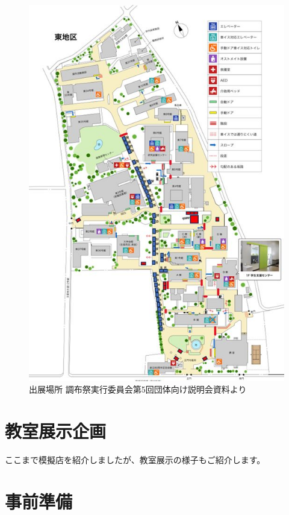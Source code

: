 \documentclass[../super_nova_20yy]{subfiles}
\begin{document}
\begin{figure}[H]
  \centering
  \includegraphics[width=.9\columnwidth]{画像5.jpg}
  \caption{出展場所 調布祭実行委員会第5回団体向け説明会資料より}
  \label{fig:5}
\end{figure}

\section{教室展示企画}

ここまで模擬店を紹介しましたが、教室展示の様子もご紹介します。

\section{事前準備}
\end{document}
